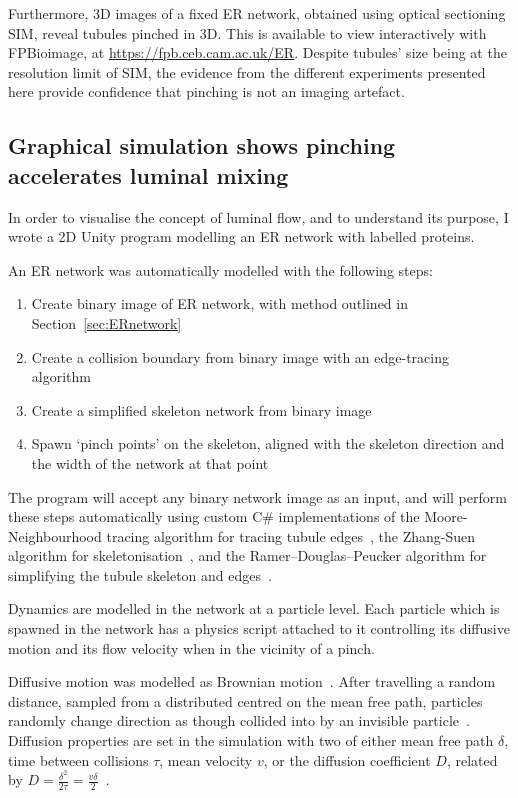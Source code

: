 Furthermore, 3D images of a fixed ER network, obtained using optical sectioning SIM, reveal tubules pinched in 3D. 
This is available to view interactively with FPBioimage, at \url{https://fpb.ceb.cam.ac.uk/ER}. 
Despite tubules' size being at the resolution limit of SIM, the evidence from the different experiments presented here provide confidence that pinching is not an imaging artefact. 

\subsection{Graphical simulation shows pinching accelerates luminal mixing}
In order to visualise the concept of luminal flow, and to understand its purpose, I wrote a 2D Unity program modelling an ER network with labelled proteins. 

An ER network was automatically modelled with the following steps:
\begin{enumerate}
	\item Create binary image of ER network, with method outlined in Section~\ref{sec:ERnetwork}
	\item Create a collision boundary from binary image with an edge-tracing algorithm
	\item Create a simplified skeleton network from binary image
	\item Spawn `pinch points' on the skeleton, aligned with the skeleton direction and the width of the network at that point
\end{enumerate}
The program will accept any binary network image as an input, and will perform these steps automatically using custom C\# implementations of the Moore-Neighbourhood tracing algorithm for tracing tubule edges~\cite{moore-neighbourhood}, the Zhang-Suen algorithm for skeletonisation~\cite{zhang1984fast}, and the Ramer–Douglas–Peucker algorithm for simplifying the tubule skeleton and edges~\cite{ramer1972iterative, douglas1973algorithms}. 

Dynamics are modelled in the network at a particle level. 
Each particle which is spawned in the network has a physics script attached to it controlling its diffusive motion and its flow velocity when in the vicinity of a pinch. 

Diffusive motion was modelled as Brownian motion~\cite{einstein1905molekularkinetischen}.
After travelling a random distance, sampled from a distributed centred on the mean free path, particles randomly change direction as though collided into by an invisible particle~\cite{lucretius1631}. 
Diffusion properties are set in the simulation with two of either mean free path $\delta$, time between collisions $\tau$, mean velocity $v$, or the diffusion coefficient $D$, related by $D=\frac{\delta^2}{2\tau}=\frac{v\delta}{2}$~\cite[\textit{ch. 19}]{fishbane1998physics}. 

